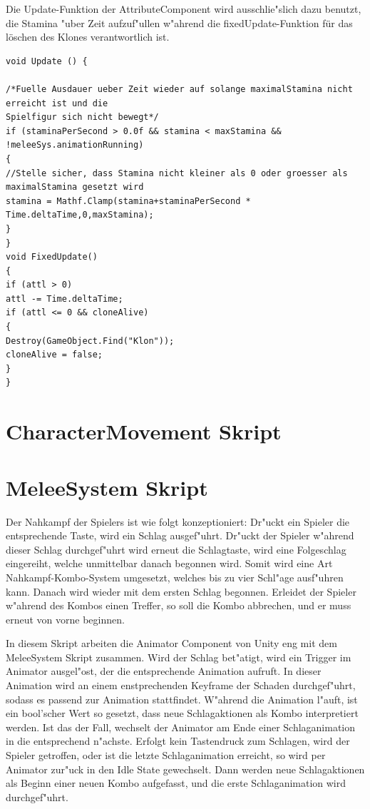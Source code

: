 Die Update-Funktion der AttributeComponent wird ausschlie"slich dazu benutzt, die Stamina "uber Zeit aufzuf"ullen w"ahrend die fixedUpdate-Funktion für das löschen des Klones verantwortlich ist.
\begin{lstlisting}[breaklines=true]
void Update () {

/*Fuelle Ausdauer ueber Zeit wieder auf solange maximalStamina nicht erreicht ist und die
Spielfigur sich nicht bewegt*/
if (staminaPerSecond > 0.0f && stamina < maxStamina && !meleeSys.animationRunning)
{
//Stelle sicher, dass Stamina nicht kleiner als 0 oder groesser als maximalStamina gesetzt wird
stamina = Mathf.Clamp(stamina+staminaPerSecond * Time.deltaTime,0,maxStamina);
}   
}
void FixedUpdate()
{
if (attl > 0)
attl -= Time.deltaTime;
if (attl <= 0 && cloneAlive)
{
Destroy(GameObject.Find("Klon"));
cloneAlive = false; 
}
}
\end{lstlisting}

\section{CharacterMovement Skript}



\section{MeleeSystem Skript}
Der Nahkampf der Spielers ist wie folgt konzeptioniert:
Dr"uckt ein Spieler die entsprechende Taste, wird ein Schlag ausgef"uhrt. Dr"uckt der Spieler w"ahrend dieser Schlag durchgef"uhrt wird erneut die Schlagtaste, wird eine Folgeschlag eingereiht, welche unmittelbar danach begonnen wird. Somit wird eine Art Nahkampf-Kombo-System umgesetzt, welches bis zu vier Schl"age ausf"uhren kann. Danach wird wieder mit dem ersten Schlag begonnen. Erleidet der Spieler w"ahrend des Kombos einen Treffer, so soll die Kombo abbrechen, und er muss erneut von vorne beginnen.

In diesem Skript arbeiten die Animator Component von Unity eng mit dem MeleeSystem Skript zusammen. Wird der Schlag bet"atigt, wird ein Trigger im Animator ausgel"ost, der die entsprechende Animation aufruft. In dieser Animation wird an einem enstprechenden Keyframe der Schaden durchgef"uhrt, sodass es passend zur Animation stattfindet. W"ahrend die Animation l"auft, ist ein bool'scher Wert so gesetzt, dass neue Schlagaktionen als Kombo interpretiert werden. Ist das der Fall, wechselt der Animator am Ende einer Schlaganimation in die entsprechend n"achste. Erfolgt kein Tastendruck zum Schlagen, wird der Spieler getroffen, oder ist die letzte Schlaganimation erreicht, so wird per Animator zur"uck in den Idle State  gewechselt. Dann werden neue Schlagaktionen als Beginn einer neuen Kombo aufgefasst, und die erste Schlaganimation wird durchgef"uhrt.

